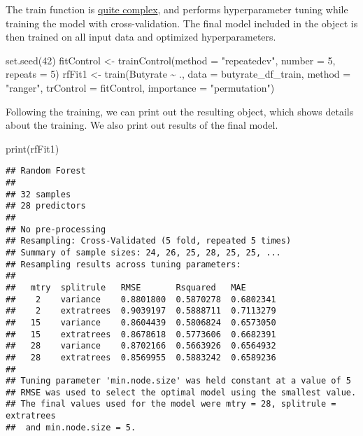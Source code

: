 \documentclass[
  oneside]{book}
\newenvironment{Shaded}{\begin{snugshade}}{\end{snugshade}}
\newcommand{\AttributeTok}[1]{\textcolor[rgb]{0.77,0.63,0.00}{#1}}
\newcommand{\DecValTok}[1]{\textcolor[rgb]{0.00,0.00,0.81}{#1}}
\newcommand{\FunctionTok}[1]{\textcolor[rgb]{0.00,0.00,0.00}{#1}}
\newcommand{\NormalTok}[1]{#1}
\newcommand{\OtherTok}[1]{\textcolor[rgb]{0.56,0.35,0.01}{#1}}
\newcommand{\SpecialCharTok}[1]{\textcolor[rgb]{0.00,0.00,0.00}{#1}}
\newcommand{\StringTok}[1]{\textcolor[rgb]{0.31,0.60,0.02}{#1}}
\begin{document}
The train function is \href{https://www.rdocumentation.org/packages/caret/versions/4.47/topics/train}{quite complex}, and performs hyperparameter tuning while training the
model with cross-validation. The final model included in the object is then trained on all
input data and optimized hyperparameters.

\begin{Shaded}
\begin{Highlighting}[]
\FunctionTok{set.seed}\NormalTok{(}\DecValTok{42}\NormalTok{)}
\NormalTok{fitControl }\OtherTok{\textless{}{-}} \FunctionTok{trainControl}\NormalTok{(}\AttributeTok{method =} \StringTok{"repeatedcv"}\NormalTok{, }\AttributeTok{number =} \DecValTok{5}\NormalTok{, }\AttributeTok{repeats =} \DecValTok{5}\NormalTok{)}
\NormalTok{rfFit1 }\OtherTok{\textless{}{-}} \FunctionTok{train}\NormalTok{(Butyrate }\SpecialCharTok{\textasciitilde{}}\NormalTok{ ., }\AttributeTok{data =}\NormalTok{ butyrate\_df\_train, }
                \AttributeTok{method =} \StringTok{"ranger"}\NormalTok{, }
                \AttributeTok{trControl =}\NormalTok{ fitControl,}
                \AttributeTok{importance =} \StringTok{"permutation"}\NormalTok{)}
\end{Highlighting}
\end{Shaded}

Following the training, we can print out the resulting object, which shows details about
the training. We also print out results of the final model.

\begin{Shaded}
\begin{Highlighting}[]
\FunctionTok{print}\NormalTok{(rfFit1)}
\end{Highlighting}
\end{Shaded}

\begin{verbatim}
## Random Forest 
## 
## 32 samples
## 28 predictors
## 
## No pre-processing
## Resampling: Cross-Validated (5 fold, repeated 5 times) 
## Summary of sample sizes: 24, 26, 25, 28, 25, 25, ... 
## Resampling results across tuning parameters:
## 
##   mtry  splitrule   RMSE       Rsquared   MAE      
##    2    variance    0.8801800  0.5870278  0.6802341
##    2    extratrees  0.9039197  0.5888711  0.7113279
##   15    variance    0.8604439  0.5806824  0.6573050
##   15    extratrees  0.8678618  0.5773606  0.6682391
##   28    variance    0.8702166  0.5663926  0.6564932
##   28    extratrees  0.8569955  0.5883242  0.6589236
## 
## Tuning parameter 'min.node.size' was held constant at a value of 5
## RMSE was used to select the optimal model using the smallest value.
## The final values used for the model were mtry = 28, splitrule = extratrees
##  and min.node.size = 5.
\end{verbatim}
\end{document}
